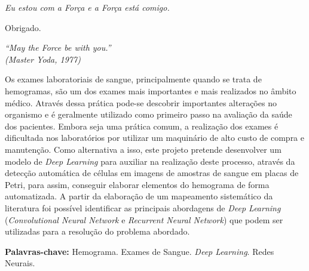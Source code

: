\documentclass[
	10pt,				%
	oneside,
	a4paper,			%
	chapter=TITLE,		%
	english,			%
	brazil				%
	]{abntex2}
\begin{document}
\begin{dedicatoria}
   \vspace*{\fill}
   \begin{flushright}
   \noindent
   \textit{Eu estou com a Força e a Força está comigo.}\vspace*{2cm}
   \end{flushright}
\end{dedicatoria}

\begin{agradecimentos}

Obrigado.

\end{agradecimentos}

\begin{epigrafe}
    \vspace*{\fill}
	\begin{flushright}
		\textit{``May the Force be with you.''\\
		(Master Yoda, 1977)}
	\end{flushright}
\end{epigrafe}

\setlength{\absparsep}{18pt} %
\begin{resumo}
	Os exames laboratoriais de sangue, principalmente quando se trata de hemogramas, são um dos exames mais importantes e mais realizados no âmbito médico. Através dessa prática pode-se descobrir importantes alterações no organismo e é geralmente utilizado como primeiro passo na avaliação da saúde dos pacientes. Embora seja uma prática comum, a realização dos exames é dificultada nos laboratórios por utilizar um maquinário de alto custo de compra e manutenção. Como alternativa a isso, este projeto pretende desenvolver um modelo de \emph{Deep Learning} para auxiliar na realização deste processo, através da detecção automática de células em imagens de amostras de sangue em placas de Petri, para assim, conseguir elaborar elementos do hemograma de forma automatizada. A partir da elaboração de um mapeamento sistemático da literatura foi possível identificar as principais abordagens de \emph{Deep Learning} (\emph{Convolutional Neural Network} e \emph{Recurrent Neural Network}) que podem ser utilizadas para a resolução do problema abordado.
			
	\textbf{Palavras-chave:} Hemograma. Exames de Sangue. \emph{Deep Learning}. Redes Neurais.
\end{resumo}
\end{document}
